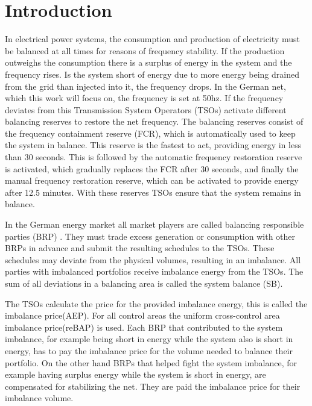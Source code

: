 \documentclass[class=scrbook, crop=false]{standalone}
\begin{document}
\chapter{Introduction}
\label{Chapter::Introduction}

In electrical power systems, the consumption and production of electricity must be balanced at all times for reasons of frequency stability\cite{weitemeyerIntegrationRenewableEnergy2015}. If the production outweighs the consumption there is a surplus of energy in the system and the frequency rises. Is the system short of energy due to more energy being drained from the grid than injected into it, the frequency drops.
In the German net, which this work will focus on, the frequency is set at 50hz. If the frequency deviates from this Transmission System Operators (TSOs) activate different balancing reserves to restore the net frequency. The balancing reserves consist of the frequency containment reserve (FCR), which is automatically used to keep the system in balance. This reserve is the fastest to act, providing energy in less than 30 seconds. This is followed by the automatic frequency restoration reserve is activated, which gradually replaces the FCR after 30 seconds, and finally the manual frequency restoration reserve, which can be activated to provide energy after 12.5 minutes. With these reserves TSOs ensure that the system remains in balance\cite{FrequencyReserves}.


In the German energy market all market players are called balancing responsible parties (BRP) \cite{narajewskiProbabilisticForecastingGerman2022}. 
They must trade excess generation or consumption with other BRPs in advance and submit the resulting schedules to the TSOs. 
These schedules may deviate from the physical volumes, resulting in an imbalance. All parties with imbalanced portfolios receive imbalance energy from the TSOs. 
The sum of all deviations in a balancing area is called the system balance (SB)\cite{eickeElectricityBalancingMarket2021}.

The TSOs calculate the price for the provided imbalance energy, this is called the imbalance price(AEP). For all control areas the uniform cross-control area imbalance price(reBAP) is used. 
Each BRP that contributed to the system imbalance, for example being short in energy while the system also is short in energy, has to pay the imbalance price for the volume needed to balance their portfolio. On the other hand BRPs that helped fight the system imbalance, for example having surplus energy while the system is short in energy, are compensated for stabilizing the net. They are paid the imbalance price for their imbalance volume\cite{eickeElectricityBalancingMarket2021}.
\end{document}
